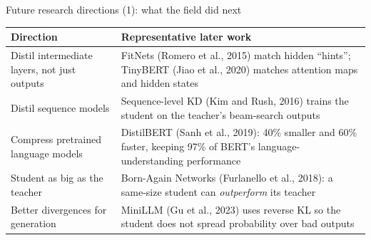 \documentclass[aspectratio=169,11pt]{beamer}
\begin{document}
\begin{frame}{Future research directions (1): what the field did next}
  \small
  \begin{tabularx}{\textwidth}{@{}lX@{}}
    \toprule
    Direction & Representative later work\\
    \midrule
    Distil intermediate layers, not just outputs & FitNets (Romero et al., 2015) match hidden ``hints''; TinyBERT (Jiao et al., 2020) matches attention maps and hidden states\\
    Distil sequence models & Sequence-level KD (Kim and Rush, 2016) trains the student on the teacher's beam-search outputs\\
    Compress pretrained language models & DistilBERT (Sanh et al., 2019): 40\% smaller and 60\% faster, keeping 97\% of BERT's language-understanding performance\\
    Student as big as the teacher & Born-Again Networks (Furlanello et al., 2018): a same-size student can \emph{outperform} its teacher\\
    Better divergences for generation & MiniLLM (Gu et al., 2023) uses reverse KL so the student does not spread probability over bad outputs\\
    \bottomrule
  \end{tabularx}
\end{frame}
\end{document}
